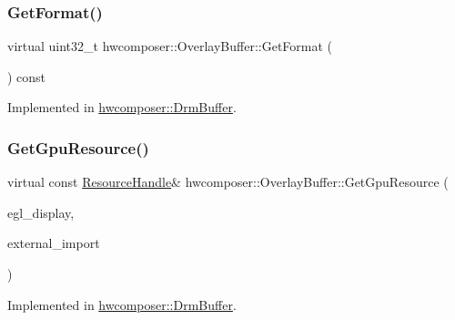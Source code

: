 \mbox{\label{classhwcomposer_1_1OverlayBuffer_af12a31161149b0f89e92e5dfc18732c5}} 
\subsubsection{\texorpdfstring{Get\+Format()}{GetFormat()}}
{\footnotesize\ttfamily virtual uint32\+\_\+t hwcomposer\+::\+Overlay\+Buffer\+::\+Get\+Format (\begin{DoxyParamCaption}{ }\end{DoxyParamCaption}) const\hspace{0.3cm}{\ttfamily [pure virtual]}}



Implemented in \mbox{\hyperlink{classhwcomposer_1_1DrmBuffer_a35eecd412bab8ea5822ec7a81c2fc34a}{hwcomposer\+::\+Drm\+Buffer}}.

\mbox{\label{classhwcomposer_1_1OverlayBuffer_a121d2b77c40a30725d804cee4d2107a5}} 
\subsubsection{\texorpdfstring{Get\+Gpu\+Resource()}{GetGpuResource()}\hspace{0.1cm}{\footnotesize\ttfamily [1/2]}}
{\footnotesize\ttfamily virtual const \mbox{\hyperlink{namespacehwcomposer_a963c5a1d5902d2d05710dba19af35b48}{Resource\+Handle}}\& hwcomposer\+::\+Overlay\+Buffer\+::\+Get\+Gpu\+Resource (\begin{DoxyParamCaption}\item[{\mbox{\hyperlink{namespacehwcomposer_ace90739a34de8ec5b30559423cdef990}{Gpu\+Display}}}]{egl\+\_\+display,  }\item[{bool}]{external\+\_\+import }\end{DoxyParamCaption})\hspace{0.3cm}{\ttfamily [pure virtual]}}



Implemented in \mbox{\hyperlink{classhwcomposer_1_1DrmBuffer_a7a2a0fe73ce6ef5468c1dc6b3b099d88}{hwcomposer\+::\+Drm\+Buffer}}.

